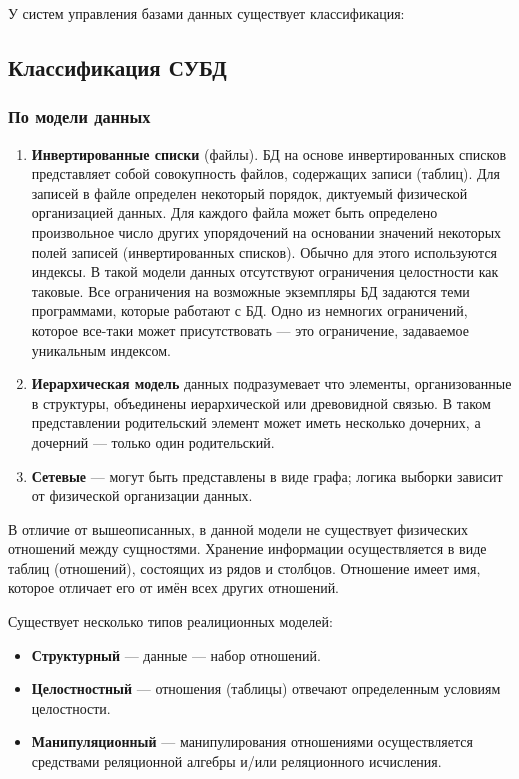 У систем управления базами данных существует классификация: 

\subsection{Классификация СУБД}

\subsubsection{По модели данных}


\begin{enumerate}[label=\arabic*.]
	\item \textbf{Инвертированные списки} (файлы). БД на основе инвертированных списков представляет собой совокупность файлов, содержащих записи (таблиц). Для записей в файле определен некоторый порядок, диктуемый физической организацией данных. Для каждого файла может быть определено произвольное число других упорядочений на основании значений некоторых полей записей (инвертированных списков). Обычно для этого используются индексы. В такой модели данных отсутствуют ограничения целостности как таковые. Все ограничения на возможные экземпляры БД задаются теми программами, которые работают с БД. Одно из немногих ограничений, которое все-таки может присутствовать --- это ограничение, задаваемое уникальным индексом. 
	\item \textbf{Иерархическая модель} данных подразумевает что элементы, организованные в структуры, объединены иерархической или древовидной связью. В таком представлении родительский элемент может иметь несколько дочерних,
	а дочерний --- только один родительский.
	\item \textbf{Сетевые} --- могут быть представлены в виде графа; логика выборки зависит от физической организации данных.
\end{enumerate}


В отличие от вышеописанных, в данной модели не существует 
физических отношений между сущностями. 
Хранение информации осуществляется
в виде таблиц (отношений), состоящих из рядов и столбцов. 
Отношение имеет
имя, которое отличает его от имён всех других отношений.

Существует несколько типов реалиционных моделей:

\begin{itemize}
	\item \textbf{Структурный} --- данные --- набор отношений.
	\item \textbf{Целостностный} --- отношения (таблицы) отвечают определенным условиям целостности.
	\item \textbf{Манипуляционный} --- манипулирования отношениями осуществляется средствами реляционной алгебры и/или реляционного исчисления.
\end{itemize}


